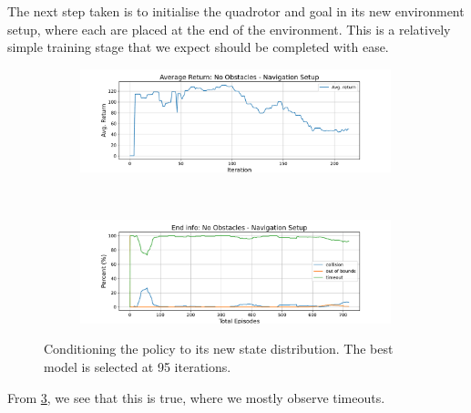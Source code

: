 The next step taken is to initialise the quadrotor and goal in its new environment setup, where each are placed at the end of the environment. This is a relatively simple training stage that we expect should be completed with ease. 
\begin{figure}[htb]
    \centering
    \begin{subfigure}[b]{\textwidth}
        \centering
        \captionsetup{justification=centering}
        \includegraphics[width=0.99\textwidth]{figures/7_/3DCarModel_BodyObs_NavSetup_0_NewObs_v0_reward.pdf}
        \label{fig:0_obst_nav_rew}
    \end{subfigure} \\
    \begin{subfigure}[b]{\textwidth}
        \centering
        \captionsetup{justification=centering}
        \includegraphics[width=0.99\textwidth]{figures/7_/3DCarModel_BodyObs_NavSetup_0_NewObs_v0_end_info.pdf}
        \label{fig:0_obst_nav_end}
    \end{subfigure}
    \caption{Conditioning the policy to its new state distribution. The best model is selected at 95 iterations.}
    \label{fig:7_train_nav_no_obst}
\end{figure}
From \cref{fig:7_train_nav_no_obst}, we see that this is true, where we mostly observe timeouts.

